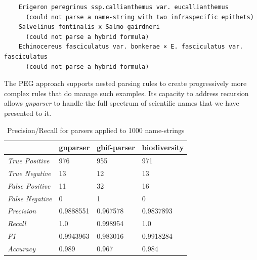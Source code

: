 \documentclass{bmcart}
\begin{document}
\vspace{0.5cm}
\begin{verbatim}
    Erigeron peregrinus ssp.callianthemus var. eucallianthemus
      (could not parse a name-string with two infraspecific epithets)
    Salvelinus fontinalis x Salmo gairdneri
      (could not parse a hybrid formula)
    Echinocereus fasciculatus var. bonkerae × E. fasciculatus var. fasciculatus
      (could not parse a hybrid formula)
\end{verbatim}

\vspace{0.5cm}

The PEG approach supports nested parsing rules to create progressively more complex rules that do manage such examples. Its capacity to address recursion allows \textit{gnparser} to handle the full spectrum of scientific names that we have presented to it.

\begin{table}[htb]
  \begin{center}
    \caption{Precision/Recall for parsers applied to 1000
    name-strings}\label{table:precision}
    \resizebox{10cm}{!} {\begin{tabular}{|l|*{3}{l}|}
      \hline
                             & gnparser & gbif-parser & biodiversity \\
      \hline
      \textit{True Positive} & 976      & 955         & 971          \\
      \textit{True Negative} & 13       & 12          & 13           \\
      \textit{False Positive}& 11       & 32          & 16           \\
      \textit{False Negative}& 0        & 1           & 0            \\
      \textit{Precision}     & 0.9888551& 0.967578    & 0.9837893    \\
      \textit{Recall}        & 1.0      & 0.998954    & 1.0          \\
      \textit{F1}            & 0.9943963& 0.983016    & 0.9918284    \\
      \textit{Accuracy}      & 0.989    & 0.967       & 0.984        \\
      \hline
    \end{tabular}
    }
  \end{center}
\end{table}
\end{document}
